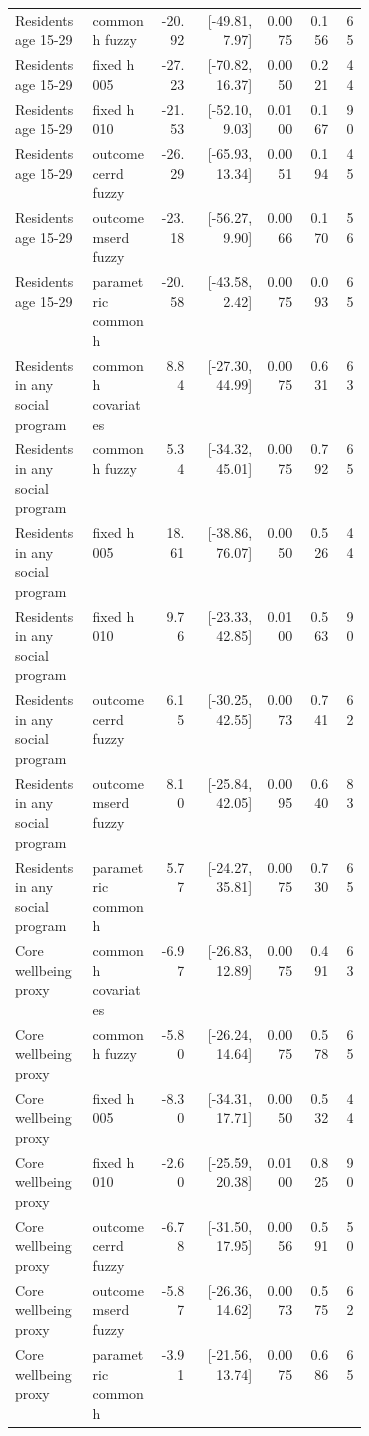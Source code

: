 \begin{longtable}{p{0.22\linewidth}p{0.19\linewidth}rrrrr}
Residents age 15-29 & common h fuzzy & -20.92 & [-49.81, 7.97] & 0.0075 & 0.156 & 65 \\
Residents age 15-29 & fixed h 005 & -27.23 & [-70.82, 16.37] & 0.0050 & 0.221 & 44 \\
Residents age 15-29 & fixed h 010 & -21.53 & [-52.10, 9.03] & 0.0100 & 0.167 & 90 \\
Residents age 15-29 & outcome cerrd fuzzy & -26.29 & [-65.93, 13.34] & 0.0051 & 0.194 & 45 \\
Residents age 15-29 & outcome mserd fuzzy & -23.18 & [-56.27, 9.90] & 0.0066 & 0.170 & 56 \\
Residents age 15-29 & parametric common h & -20.58 & [-43.58, 2.42] & 0.0075 & 0.093 & 65 \\
Residents in any social program & common h covariates & 8.84 & [-27.30, 44.99] & 0.0075 & 0.631 & 63 \\
Residents in any social program & common h fuzzy & 5.34 & [-34.32, 45.01] & 0.0075 & 0.792 & 65 \\
Residents in any social program & fixed h 005 & 18.61 & [-38.86, 76.07] & 0.0050 & 0.526 & 44 \\
Residents in any social program & fixed h 010 & 9.76 & [-23.33, 42.85] & 0.0100 & 0.563 & 90 \\
Residents in any social program & outcome cerrd fuzzy & 6.15 & [-30.25, 42.55] & 0.0073 & 0.741 & 62 \\
Residents in any social program & outcome mserd fuzzy & 8.10 & [-25.84, 42.05] & 0.0095 & 0.640 & 83 \\
Residents in any social program & parametric common h & 5.77 & [-24.27, 35.81] & 0.0075 & 0.730 & 65 \\
Core wellbeing proxy & common h covariates & -6.97 & [-26.83, 12.89] & 0.0075 & 0.491 & 63 \\
Core wellbeing proxy & common h fuzzy & -5.80 & [-26.24, 14.64] & 0.0075 & 0.578 & 65 \\
Core wellbeing proxy & fixed h 005 & -8.30 & [-34.31, 17.71] & 0.0050 & 0.532 & 44 \\
Core wellbeing proxy & fixed h 010 & -2.60 & [-25.59, 20.38] & 0.0100 & 0.825 & 90 \\
Core wellbeing proxy & outcome cerrd fuzzy & -6.78 & [-31.50, 17.95] & 0.0056 & 0.591 & 50 \\
Core wellbeing proxy & outcome mserd fuzzy & -5.87 & [-26.36, 14.62] & 0.0073 & 0.575 & 62 \\
Core wellbeing proxy & parametric common h & -3.91 & [-21.56, 13.74] & 0.0075 & 0.686 & 65 \\

\end{longtable}
